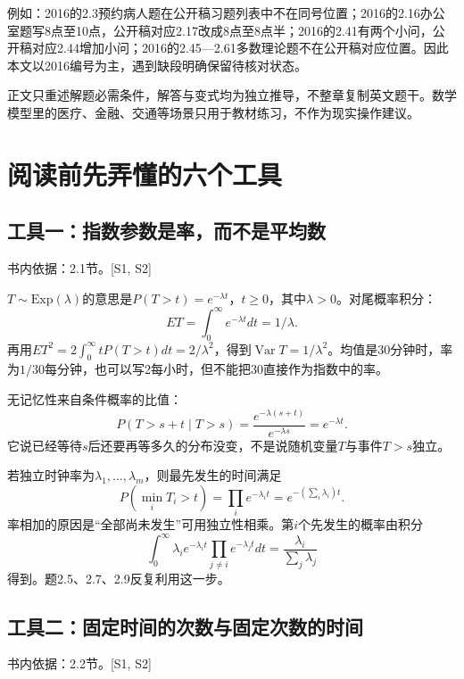 \documentclass[
  11pt,
  a4paper,
  UTF8,fontset=fandol]{ctexart}
\let\OldSection\section
\renewcommand{\section}{\Needspace{7\baselineskip}\OldSection}
\let\OldSubsection\subsection
\renewcommand{\subsection}{\Needspace{5\baselineskip}\OldSubsection}
\begin{document}
例如：2016的2.3预约病人题在公开稿习题列表中不在同号位置；2016的2.16办公室题写8点至10点，公开稿对应2.17改成8点至8点半；2016的2.41有两个小问，公开稿对应2.44增加小问；2016的2.45---2.61多数理论题不在公开稿对应位置。因此本文以2016编号为主，遇到缺段明确保留待核对状态。

正文只重述解题必需条件，解答与变式均为独立推导，不整章复制英文题干。数学模型里的医疗、金融、交通等场景只用于教材练习，不作为现实操作建议。

\section{阅读前先弄懂的六个工具}\label{ux9605ux8bfbux524dux5148ux5f04ux61c2ux7684ux516dux4e2aux5de5ux5177}

\subsection{工具一：指数参数是率，而不是平均数}\label{ux5de5ux5177ux4e00ux6307ux6570ux53c2ux6570ux662fux7387ux800cux4e0dux662fux5e73ux5747ux6570}

书内依据：2.1节。{[}S1, S2{]}

\(T\sim\mathrm{Exp}(\lambda)\)的意思是\(P(T>t)=e^{-\lambda t}\)，\(t\ge0\)，其中\(\lambda>0\)。对尾概率积分：
\[ET=\int_0^\infty e^{-\lambda t}dt=1/\lambda.\]
再用\(ET^2=2\int_0^\infty tP(T>t)dt=2/\lambda^2\)，得到\(\operatorname{Var}T=1/\lambda^2\)。均值是30分钟时，率为\(1/30\)每分钟，也可以写2每小时，但不能把30直接作为指数中的率。

无记忆性来自条件概率的比值：
\[P(T>s+t\mid T>s)=\frac{e^{-\lambda(s+t)}}{e^{-\lambda s}}=e^{-\lambda t}.\]
它说已经等待\(s\)后还要再等多久的分布没变，不是说随机变量\(T\)与事件\(T>s\)独立。

若独立时钟率为\(\lambda_1,\ldots,\lambda_m\)，则最先发生的时间满足
\[P(\min_iT_i>t)=\prod_i e^{-\lambda_it}=e^{-(\sum_i\lambda_i)t}.\]
率相加的原因是``全部尚未发生''可用独立性相乘。第\(i\)个先发生的概率由积分
\[\int_0^\infty\lambda_i e^{-\lambda_i t}\prod_{j\ne i}e^{-\lambda_jt}dt=\frac{\lambda_i}{\sum_j\lambda_j}\]
得到。题2.5、2.7、2.9反复利用这一步。

\subsection{工具二：固定时间的次数与固定次数的时间}\label{ux5de5ux5177ux4e8cux56faux5b9aux65f6ux95f4ux7684ux6b21ux6570ux4e0eux56faux5b9aux6b21ux6570ux7684ux65f6ux95f4}

书内依据：2.2节。{[}S1, S2{]}
\end{document}
